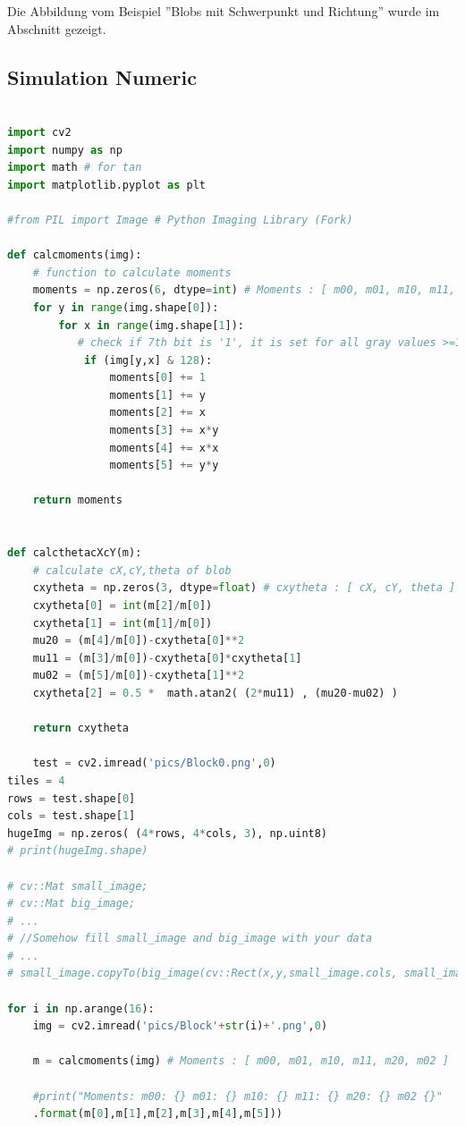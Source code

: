\documentclass[a4paper]{report}
\begin{document}
Die Abbildung vom Beispiel ''Blobs mit Schwerpunkt und Richtung'' wurde im  Abschnitt \textbf{ } gezeigt.


\subsection{Simulation Numeric}

\begin{lstlisting}[language=Python, caption=Simulation Numeric]

import cv2
import numpy as np 
import math # for tan
import matplotlib.pyplot as plt

#from PIL import Image # Python Imaging Library (Fork)

def calcmoments(img):
    # function to calculate moments
    moments = np.zeros(6, dtype=int) # Moments : [ m00, m01, m10, m11, m20, m02 ]
    for y in range(img.shape[0]):
        for x in range(img.shape[1]):
           # check if 7th bit is '1', it is set for all gray values >=128
            if (img[y,x] & 128): 
                moments[0] += 1
                moments[1] += y
                moments[2] += x
                moments[3] += x*y
                moments[4] += x*x
                moments[5] += y*y
    
    return moments
    
    
def calcthetacXcY(m):
    # calculate cX,cY,theta of blob
    cxytheta = np.zeros(3, dtype=float) # cxytheta : [ cX, cY, theta ]
    cxytheta[0] = int(m[2]/m[0])
    cxytheta[1] = int(m[1]/m[0])
    mu20 = (m[4]/m[0])-cxytheta[0]**2
    mu11 = (m[3]/m[0])-cxytheta[0]*cxytheta[1]
    mu02 = (m[5]/m[0])-cxytheta[1]**2
    cxytheta[2] = 0.5 *  math.atan2( (2*mu11) , (mu20-mu02) )
    
    return cxytheta
    
    test = cv2.imread('pics/Block0.png',0)
tiles = 4
rows = test.shape[0]
cols = test.shape[1]
hugeImg = np.zeros( (4*rows, 4*cols, 3), np.uint8)
# print(hugeImg.shape)

# cv::Mat small_image;
# cv::Mat big_image;
# ...
# //Somehow fill small_image and big_image with your data
# ...
# small_image.copyTo(big_image(cv::Rect(x,y,small_image.cols, small_image.rows)));

for i in np.arange(16):
    img = cv2.imread('pics/Block'+str(i)+'.png',0)
    
    m = calcmoments(img) # Moments : [ m00, m01, m10, m11, m20, m02 ]
    
    #print("Moments: m00: {} m01: {} m10: {} m11: {} m20: {} m02 {}"
    .format(m[0],m[1],m[2],m[3],m[4],m[5]))
    

\end{lstlisting}
\end{document}
